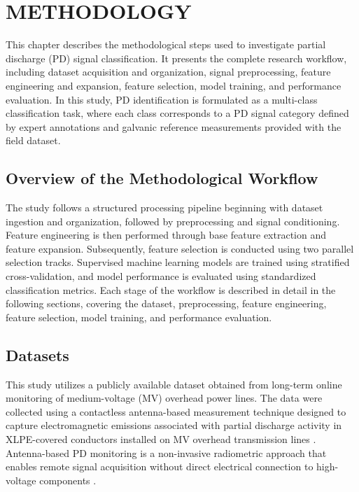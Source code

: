 \chapter{METHODOLOGY}

This chapter describes the methodological steps used to investigate partial discharge (\ac{PD}) signal classification. It presents the complete research workflow, including dataset acquisition and organization, signal preprocessing, feature engineering and expansion, feature selection, model training, and performance evaluation. In this study, \ac{PD} identification is formulated as a multi-class classification task, where each class corresponds to a \ac{PD} signal category defined by expert annotations and galvanic reference measurements provided with the field dataset.

\section{Overview of the Methodological Workflow}

The study follows a structured processing pipeline beginning with dataset ingestion and organization, followed by preprocessing and signal conditioning. Feature engineering is then performed through base feature extraction and feature expansion. Subsequently, feature selection is conducted using two parallel selection tracks. Supervised machine learning models are trained using stratified cross-validation, and model performance is evaluated using standardized classification metrics. Each stage of the workflow is described in detail in the following sections, covering the dataset, preprocessing, feature engineering, feature selection, model training, and performance evaluation.

\section{Datasets}

This study utilizes a publicly available dataset obtained from long-term online monitoring of medium-voltage (\ac{MV}) overhead power lines. The data were collected using a contactless antenna-based measurement technique designed to capture electromagnetic emissions associated with partial discharge activity in \ac{XLPE}-covered conductors installed on \ac{MV} overhead transmission lines \parencite{Klein_2024_1}. Antenna-based \ac{PD} monitoring is a non-invasive radiometric approach that enables remote signal acquisition without direct electrical connection to high-voltage components \parencite{Cruz_2023, Azam_2024}.

